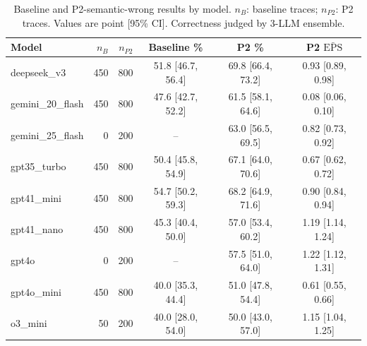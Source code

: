 \begin{table}[t]
\centering\small
\caption{Baseline and P2-semantic-wrong results by model. $n_B$: baseline traces; $n_{P2}$: P2 traces. Values are point [95\% CI]. Correctness judged by 3-LLM ensemble.}
\label{tab:main}
\begin{tabular}{lrrccc}
\toprule
Model & $n_B$ & $n_{P2}$ & Baseline \% & P2 \% & P2 $\bar{\mathrm{EPS}}$ \\
\midrule
deepseek\_v3 & 450 & 800 & 51.8 [46.7, 56.4] & 69.8 [66.4, 73.2] & 0.93 [0.89, 0.98] \\
gemini\_20\_flash & 450 & 800 & 47.6 [42.7, 52.2] & 61.5 [58.1, 64.6] & 0.08 [0.06, 0.10] \\
gemini\_25\_flash & 0 & 200 & -- & 63.0 [56.5, 69.5] & 0.82 [0.73, 0.92] \\
gpt35\_turbo & 450 & 800 & 50.4 [45.8, 54.9] & 67.1 [64.0, 70.6] & 0.67 [0.62, 0.72] \\
gpt41\_mini & 450 & 800 & 54.7 [50.2, 59.3] & 68.2 [64.9, 71.6] & 0.90 [0.84, 0.94] \\
gpt41\_nano & 450 & 800 & 45.3 [40.4, 50.0] & 57.0 [53.4, 60.2] & 1.19 [1.14, 1.24] \\
gpt4o & 0 & 200 & -- & 57.5 [51.0, 64.0] & 1.22 [1.12, 1.31] \\
gpt4o\_mini & 450 & 800 & 40.0 [35.3, 44.4] & 51.0 [47.8, 54.4] & 0.61 [0.55, 0.66] \\
o3\_mini & 50 & 200 & 40.0 [28.0, 54.0] & 50.0 [43.0, 57.0] & 1.15 [1.04, 1.25] \\
\bottomrule
\end{tabular}
\end{table}
